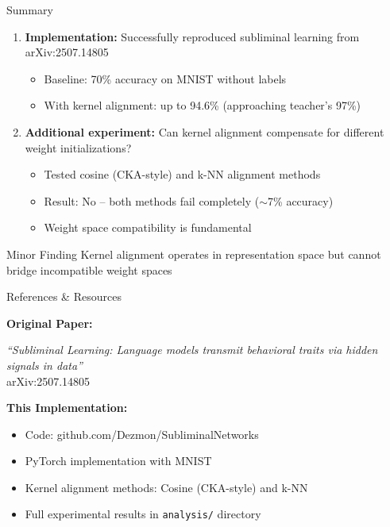 \documentclass{beamer}
\begin{document}
\begin{frame}{Summary}

\begin{enumerate}
    \item \textbf{Implementation:} Successfully reproduced subliminal learning from arXiv:2507.14805
    \begin{itemize}
        \item Baseline: 70\% accuracy on MNIST without labels
        \item With kernel alignment: up to 94.6\% (approaching teacher's 97\%)
    \end{itemize}

    \vspace{0.5em}

    \item \textbf{Additional experiment:} Can kernel alignment compensate for different weight initializations?
    \begin{itemize}
        \item Tested cosine (CKA-style) and k-NN alignment methods
        \item \alert{Result: No} -- both methods fail completely ($\sim$7\% accuracy)
        \item Weight space compatibility is fundamental
    \end{itemize}
\end{enumerate}

\vspace{1em}

\begin{block}{Minor Finding}
Kernel alignment operates in representation space but cannot bridge incompatible weight spaces
\end{block}

\end{frame}

\begin{frame}{References \& Resources}

\textbf{Original Paper:}

\vspace{0.5em}

\small
\textit{``Subliminal Learning: Language models transmit behavioral traits via hidden signals in data''}\\
arXiv:2507.14805

\vspace{1.5em}

\normalsize
\textbf{This Implementation:}

\vspace{0.5em}

\begin{itemize}
    \item Code: github.com/Dezmon/SubliminalNetworks
    \item PyTorch implementation with MNIST
    \item Kernel alignment methods: Cosine (CKA-style) and k-NN
    \item Full experimental results in \texttt{analysis/} directory
\end{itemize}

\end{frame}
\end{document}
